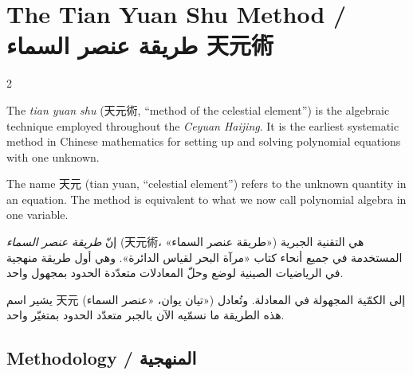\documentclass[11pt,a4paper]{article}
\newcommand{\ar}[1]{\arabicfont\beginR #1\endR}
\begin{document}
\newpage


\section{The Tian Yuan Shu Method / \ar{طريقة عنصر السماء 天元術}}
\label{sec:tianyuan}

\begin{paracol}{2}

The \textit{tian yuan shu} (天元術, ``method of the celestial element'') is the algebraic technique employed throughout the \textit{Ceyuan Haijing}. It is the earliest systematic method in Chinese mathematics for setting up and solving polynomial equations with one unknown.

\vspace{0.3cm}

The name 天元 (tian yuan, ``celestial element'') refers to the unknown quantity in an equation. The method is equivalent to what we now call polynomial algebra in one variable.

\switchcolumn

\ar{إنّ \textit{طريقة عنصر السماء} (天元術، «طريقة عنصر السماء») هي التقنية الجبرية المستخدمة في جميع أنحاء كتاب «مرآة البحر لقياس الدائرة». وهي أول طريقة منهجية في الرياضيات الصينية لوضع وحلّ المعادلات متعدّدة الحدود بمجهول واحد.}

\vspace{0.3cm}

\ar{يشير اسم 天元 (تيان يوان، «عنصر السماء») إلى الكمّية المجهولة في المعادلة. وتُعادل هذه الطريقة ما نسمّيه الآن بالجبر متعدّد الحدود بمتغيّر واحد.}

\end{paracol}

\subsection{Methodology / \ar{المنهجية}}
\end{document}
